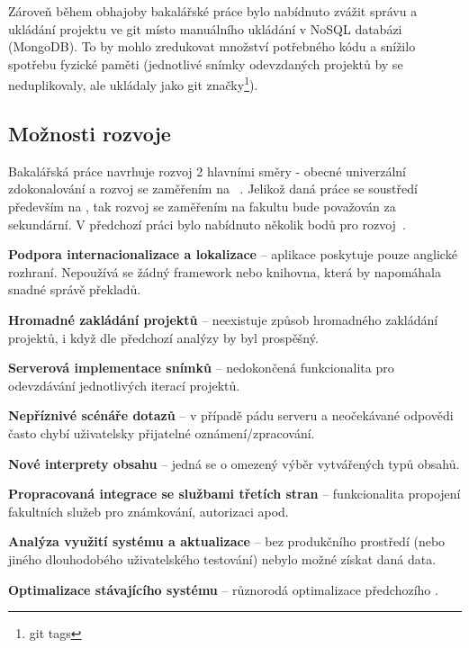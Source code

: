 Zároveň během obhajoby bakalářské práce bylo nabídnuto zvážit správu a ukládání projektu ve  git místo manuálního ukládání v NoSQL databázi (MongoDB).
To by mohlo zredukovat množství potřebného kódu a snížilo spotřebu fyzické paměti (jednotlivé snímky odevzdaných projektů by se neduplikovaly, ale ukládaly jako git značky\footnote{git tags}).



\subsection{Možnosti rozvoje}

Bakalářská práce navrhuje rozvoj 2 hlavními směry - obecné univerzální zdokonalování a rozvoj se zaměřením na  ~\cite{bachelorthesis}.
Jelikož daná práce se soustředí především na , tak rozvoj se zaměřením na fakultu bude považován za sekundární.
V předchozí práci bylo nabídnuto několik bodů pro rozvoj~\cite{bachelorthesis}.


\begin{ul}
   \item
   \textbf{Podpora internacionalizace a lokalizace} – aplikace poskytuje pouze anglické rozhraní.
   Nepoužívá se žádný framework nebo knihovna, která by napomáhala snadné správě překladů.

   \item
   \textbf{Hromadné zakládání projektů} – neexistuje způsob hromadného zakládání projektů, i když dle předchozí analýzy by byl prospěšný.

   \item
   \textbf{Serverová implementace snímků} – nedokončená funkcionalita pro odevzdávání jednotlivých iterací projektů.

   \item
   \textbf{Nepříznivé scénáře  dotazů} – v případě pádu serveru a neočekávané  odpovědi často chybí uživatelsky přijatelné oznámení/zpracování.

   \item
   \textbf{Nové interprety obsahu} – jedná se o omezený výběr vytvářených typů obsahů.

   \item
   \textbf{Propracovaná integrace se službami třetích stran} – funkcionalita propojení fakultních služeb pro známkování, autorizaci apod.

   \item
   \textbf{Analýza využití systému a aktualizace } – bez produkčního prostředí (nebo jiného dlouhodobého uživatelského testování) nebylo možné získat daná data.

   \item
   \textbf{Optimalizace stávajícího systému} – různorodá optimalizace předchozího .
\end{ul}




